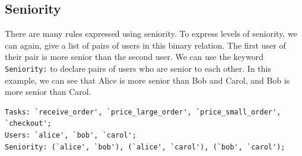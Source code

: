\documentclass[a4paper]{report}
\begin{document}
\subsection{Seniority}
There are many rules expressed using seniority. To express levels of seniority, we can again, give a list of pairs of users in this binary relation. The first user of their pair is more senior than the second user. We can use the keyword \texttt{Seniority:} to declare pairs of users who are senior to each other. In this example, we can see that Alice is more senior than Bob and Carol, and Bob is more senior than Carol.
\begin{lstlisting}[frame=single]
Tasks: `receive_order', `price_large_order', `price_small_order', 
`checkout'; 
Users: `alice', `bob', `carol';
Seniority: (`alice', `bob'), (`alice', `carol'), (`bob', `carol');
\end{lstlisting} 
\end{document}
